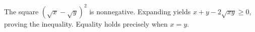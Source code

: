 The square $(\sqrt x-\sqrt y)^2$ is nonnegative. Expanding yields $x+y-2\sqrt{xy}\ge0$, proving the inequality. Equality holds precisely when $x=y$.

